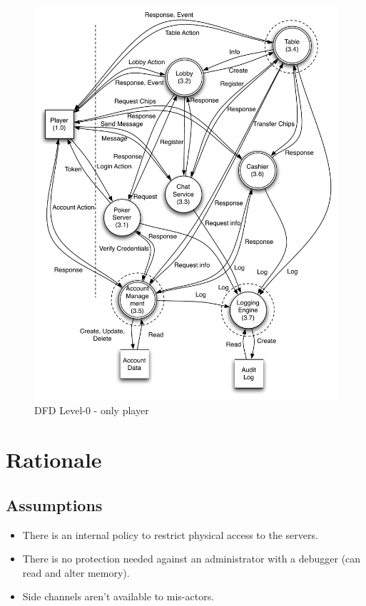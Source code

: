 \documentclass[a4paper,11pt]{report}
\begin{document}
\begin{figure}[p]
  \begin{center}
    \includegraphics[scale=0.7]{dfd_level_0_player}
  \end{center}
  \caption{DFD Level-0 - only player}\label{fig:level_0_player}
\end{figure}

\section{Rationale}
\subsection{Assumptions}
\begin{itemize}
\item There is an internal policy to restrict physical access to the servers. 
\item There is no protection needed against an administrator with a debugger (can read and alter memory).
\item Side channels aren't available to mis-actors.
\end{itemize}
\end{document}
